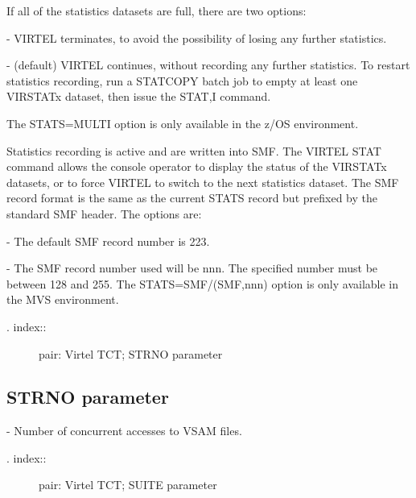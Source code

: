 \documentclass[letterpaper,10pt,english]{sphinxmanual}
\begin{document}
If all of the statistics datasets are full, there are two options:

 - VIRTEL terminates, to avoid the possibility of losing any further statistics.

 - (default) VIRTEL continues, without recording any further statistics. To restart statistics recording, run a STATCOPY batch job to empty at least one VIRSTATx dataset, then issue the STAT,I command.

The STATS=MULTI option is only available in the z/OS environment.

 Statistics recording is active and are written into SMF. The VIRTEL STAT command allows the console operator to display the status of the VIRSTATx datasets, or to force VIRTEL to switch to the next statistics dataset. The SMF record format is the same as the current STATS record but prefixed by the standard SMF header. The options are:

 - The default SMF record number is 223.

 - The SMF record number used will be nnn. The specified number must be between 128 and 255. The STATS=SMF/(SMF,nnn) option is only available in the MVS environment.
\begin{description}
\item[{. index::}] \leavevmode
pair: Virtel TCT; STRNO parameter

\end{description}


\subsection{STRNO parameter}
\label{\detokenize{Installation_Guide:strno-parameter}}
\begin{sphinxVerbatim}[commandchars=\\\{\}]
 
\end{sphinxVerbatim}

 - Number of concurrent accesses to VSAM files.
\begin{description}
\item[{. index::}] \leavevmode
pair: Virtel TCT; SUITE parameter

\end{description}
\end{document}
